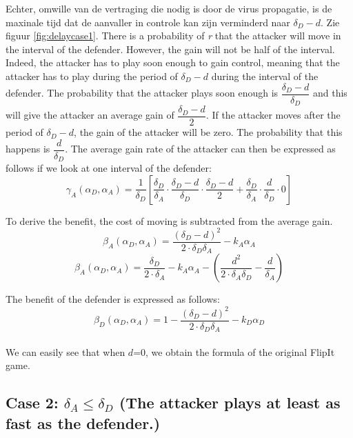 \documentclass[master=cws, masteroption=vs,english]{kulemt}
\begin{document}
\begin{abstract*}
Echter, omwille van de vertraging die nodig is door de virus propagatie, is de maxinale tijd dat de aanvaller in controle kan zijn verminderd naar $\delta_{D}-d$. Zie figuur \ref{fig:delaycase1}. There is a probability of \textit{r} that the attacker will move in the interval of the defender. However, the gain will not be half of the interval. Indeed, the attacker has to play soon enough to gain control, meaning that the attacker has to play during the period of $\delta_{D}-d$ during the interval of the defender. The probability that the attacker plays soon enough is $\dfrac{\delta_{D}-d}{\delta_{D}}$ and this will give the attacker an average gain of $\dfrac{\delta_{D}-d}{2}$. If the attacker moves after the period of $\delta_{D}-d$, the gain of the attacker will be zero. The probability that this happens is  $\dfrac{d}{\delta_{D}}$. The average gain rate of the attacker can then be expressed as follows if we look at one interval of the defender:
\begin{equation}\label{first}
\gamma_{A}(\alpha_{D},\alpha_{A}) = \dfrac {1}{\delta_{D}} [ \dfrac{\delta_{D}}{\delta_{A}} \cdot \dfrac{\delta_{D}-d}{\delta_{D}} \cdot \dfrac{\delta_{D}-d}{2} + \dfrac{\delta_{D}}{\delta_{A}} \cdot \dfrac{d}{\delta_{D}} \cdot 0 ]
\end{equation}

To derive the benefit, the cost of moving is subtracted from the average gain. 
\begin{equation}\label{first}
\beta_{A}(\alpha_{D},\alpha_{A}) = \dfrac { (\delta_{D}-d) ^{2}} {2 \cdot \delta_{D}  \delta_{A}} - k_{A} \alpha_{A}
\end{equation}
\begin{equation}\label{first}
\beta_{A}(\alpha_{D},\alpha_{A}) = \dfrac { \delta_{D}} {2 \cdot \delta_{A}} - k_{A} \alpha_{A} - ( \dfrac{d^{2}}{2 \cdot \delta_{A} \delta_{D}} - \dfrac{d}{\delta_{A}} )
\end{equation}
 
 
 The benefit of the defender is expressed as follows:
 \begin{equation}\label{first}
\beta_{D}(\alpha_{D},\alpha_{A}) = 1 - \dfrac { (\delta_{D}-d) ^{2}} {2 \cdot \delta_{D}  \delta_{A}} - k_{D} \alpha_{D}
\end{equation}
~~\\
We can easily see that when $d$=0, we obtain the formula of the original FlipIt game.\\


\subsection*{\textbf{Case 2:} $\delta_{A} \leq \delta_{D} $ (The attacker plays at least as fast as the defender.) }


\end{abstract*}
\end{document}
